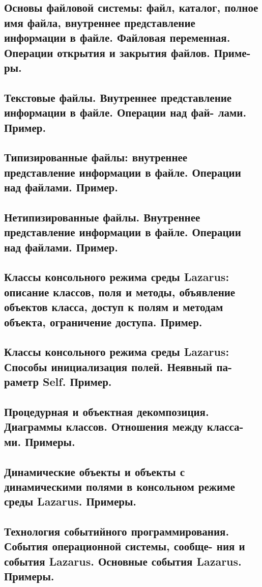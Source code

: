 \subsection{Основы файловой системы: файл, каталог, полное имя файла, внутреннее представление 
информации в файле. Файловая переменная. Операции открытия и закрытия файлов. Приме-
ры. }



\subsection{Текстовые  файлы.  Внутреннее  представление  информации  в  файле.  Операции  над  фай-
лами. Пример. }



\subsection{Типизированные  файлы:  внутреннее  представление  информации  в  файле.  Операции  над 
файлами. Пример. }



\subsection{Нетипизированные  файлы.  Внутреннее  представление  информации  в  файле.  Операции 
над файлами. Пример. }



\subsection{Классы консольного режима среды Lazarus: описание классов, поля и методы, объявление 
объектов класса, доступ к полям и методам объекта, ограничение доступа. Пример. }



\subsection{Классы консольного режима  среды  Lazarus: Способы инициализация полей. Неявный па-
раметр Self. Пример. }



\subsection{Процедурная и объектная декомпозиция. Диаграммы классов. Отношения между класса-
ми. Примеры. }



\subsection{Динамические объекты и объекты с динамическими полями в консольном режиме среды 
Lazarus. Примеры. }



\subsection{Технология  событийного  программирования.  События  операционной  системы,  сообще-
ния и события Lazarus. Основные события Lazarus. Примеры.}



